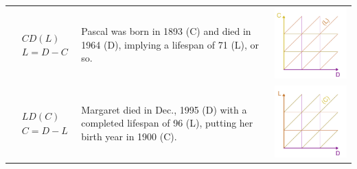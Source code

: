 \documentclass[12pt,oneside,a4paper]{article} %
\theoremstyle{definition}
\begin{document}
\begin{longtable}{m{}L{0.4\textwidth}m{0.2\textwidth}}
  \\
  $$\begin{aligned}
    &CD(L) \\
    &L = D - C
  \end{aligned}$$ &
  Pascal was born in 1893 (C) and died in 1964 (D), implying a lifespan of 71 (L), or so. &
  \includegraphics[scale=.5]{Figures/DiagramTable/CD_rt.pdf} %
  \\
  $$\begin{aligned}
    &LD(C) \\
    &C = D - L
  \end{aligned}$$ &
  Margaret died in Dec., 1995 (D) with a completed lifespan of 96 (L), putting her birth year in 1900 (C). &
  \includegraphics[scale=.5]{Figures/DiagramTable/LD_rt.pdf} %
  \\
  \midrule

\end{longtable}
\end{document}
